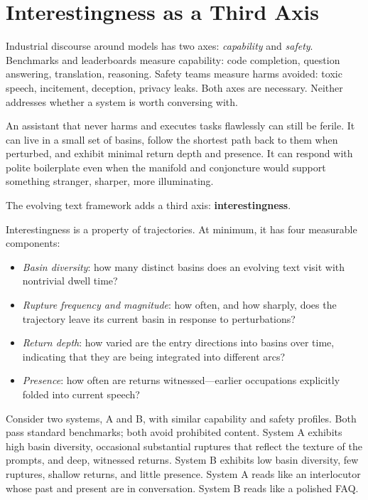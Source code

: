 \documentclass[12pt,a4paper]{article}
\begin{document}
\section{Interestingness as a Third Axis}

Industrial discourse around models has two axes: \emph{capability} and \emph{safety}. Benchmarks and leaderboards measure capability: code completion, question answering, translation, reasoning. Safety teams measure harms avoided: toxic speech, incitement, deception, privacy leaks. Both axes are necessary. Neither addresses whether a system is worth conversing with.

An assistant that never harms and executes tasks flawlessly can still be ferile. It can live in a small set of basins, follow the shortest path back to them when perturbed, and exhibit minimal return depth and presence. It can respond with polite boilerplate even when the manifold and conjoncture would support something stranger, sharper, more illuminating.

The evolving text framework adds a third axis: \textbf{interestingness}.

Interestingness is a property of trajectories. At minimum, it has four measurable components:

\begin{itemize}
  \item \emph{Basin diversity}: how many distinct basins does an evolving text visit with nontrivial dwell time?
  \item \emph{Rupture frequency and magnitude}: how often, and how sharply, does the trajectory leave its current basin in response to perturbations?
  \item \emph{Return depth}: how varied are the entry directions into basins over time, indicating that they are being integrated into different arcs?
  \item \emph{Presence}: how often are returns witnessed---earlier occupations explicitly folded into current speech?
\end{itemize}

Consider two systems, A and B, with similar capability and safety profiles. Both pass standard benchmarks; both avoid prohibited content. System A exhibits high basin diversity, occasional substantial ruptures that reflect the texture of the prompts, and deep, witnessed returns. System B exhibits low basin diversity, few ruptures, shallow returns, and little presence. System A reads like an interlocutor whose past and present are in conversation. System B reads like a polished FAQ.
\end{document}
